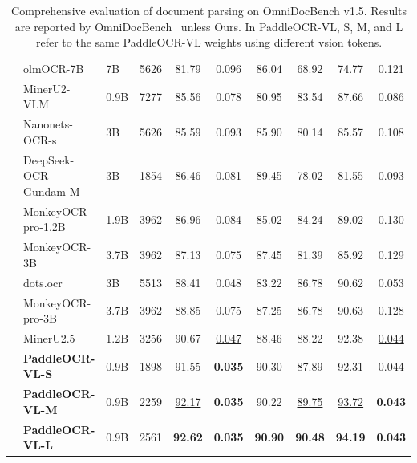 \begin{table}[h]
{\begin{tabular}{l|ll|c|c c c c c c}
        & olmOCR-7B~\cite{poznanski2025olmocr} & 7B & 5626 & 81.79 & 0.096 & 86.04 & 68.92 & 74.77 & 0.121 \\
        & MinerU2-VLM~\cite{MinerU2} & 0.9B & 7277 & 85.56 & 0.078 & 80.95 & 83.54 & 87.66 & 0.086 \\
        & Nanonets-OCR-s~\cite{Nanonets-OCR-S} & 3B & 5626 & 85.59 & 0.093 & 85.90 & 80.14 & 85.57 & 0.108 \\
        & DeepSeek-OCR-Gundam-M & 3B & 1854 & 86.46 & 0.081 & 89.45 & 78.02 & 81.55 & 0.093 \\
        & MonkeyOCR-pro-1.2B~\cite{li2025monkeyocr} & 1.9B & 3962 & 86.96 & 0.084 & 85.02 & 84.24 & 89.02 & 0.130 \\
        & MonkeyOCR-3B~\cite{li2025monkeyocr} & 3.7B & 3962 & 87.13 & 0.075 & 87.45 & 81.39 & 85.92 & 0.129 \\
        & dots.ocr~\cite{dotsocr} & 3B & 5513 & 88.41 & 0.048 & 83.22 & 86.78 & 90.62 & 0.053 \\
        & MonkeyOCR-pro-3B~\cite{li2025monkeyocr} & 3.7B & 3962 & 88.85 & 0.075 & 87.25 & 86.78 & 90.63 & 0.128 \\
        & MinerU2.5~\cite{niu2025mineru2} & 1.2B & 3256 & 90.67 & \cellcolor{cyan!15}\underline{0.047} & 88.46 & 88.22 & 92.38 & \cellcolor{cyan!15}\underline{0.044} \\
        & \textbf{PaddleOCR-VL-S} & 0.9B & 1898 & 91.55 & \cellcolor{red!15}\textbf{0.035} & \cellcolor{cyan!15}\underline{90.30} &
        87.89 &
        92.31 &
        \cellcolor{cyan!15}\underline{0.044} \\
        & \textbf{PaddleOCR-VL-M} & 0.9B & 2259 & \cellcolor{cyan!15}\underline{92.17} & \cellcolor{red!15}\textbf{0.035} & 90.22 & \cellcolor{cyan!15}\underline{89.75} & \cellcolor{cyan!15}\underline{93.72} & \cellcolor{red!15}\textbf{0.043} \\
        & \textbf{PaddleOCR-VL-L} & 0.9B & 2561 & \cellcolor{red!15}\textbf{92.62} & \cellcolor{red!15}\textbf{0.035} & \cellcolor{red!15}\textbf{90.90} & \cellcolor{red!15}\textbf{90.48} & \cellcolor{red!15}\textbf{94.19} & \cellcolor{red!15}\textbf{0.043} \\
        \bottomrule
    \end{tabular}%
    }
   \caption{Comprehensive evaluation of document parsing on OmniDocBench v1.5. Results are reported by OmniDocBench~\cite{ouyang2025omnidocbench} unless Ours. In PaddleOCR-VL, S, M, and L refer to the same PaddleOCR-VL weights using different vsion tokens.}
   \label{tab:omni15_performance}
\end{table}

